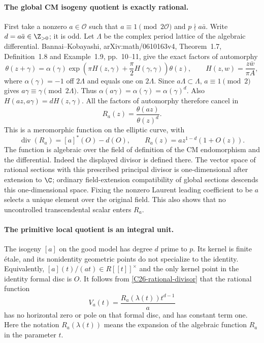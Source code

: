 \documentclass[11pt]{article}
\theoremstyle{definition}\newtheorem{definition}[theorem]{Definition}\newtheorem{remark}[theorem]{Remark}
\begin{document}
\paragraph{The global CM isogeny quotient is exactly rational.}
First take a nonzero $a\in\mathcal O$ such that
$a\equiv1\pmod{2\mathcal O}$ and $p\nmid a\bar a$.
Write $d=a\bar a\in\Z_{>0}$; it is odd.
Let $\Lambda$ be the complex period lattice of the algebraic
differential.  Bannai--Kobayashi, arXiv:math/0610163v4,
Theorem~1.7, Definition~1.8 and Example~1.9, pp.~10--11,
give the exact factors of automorphy
\[
 \theta(z+\gamma)
 =\alpha(\gamma)
   \exp\!\left(\pi H(z,\gamma)+\frac\pi2H(\gamma,\gamma)\right)
   \theta(z),\qquad
 H(z,w)=\frac{z\bar w}{\pi A},
\]
where $\alpha(\gamma)=-1$ off $2\Lambda$ and equals one on
$2\Lambda$.  Since $a\Lambda\subset\Lambda$,
$a\equiv1\pmod2$ gives $a\gamma\equiv\gamma\pmod{2\Lambda}$.
Thus $\alpha(a\gamma)=\alpha(\gamma)=\alpha(\gamma)^d$.
Also $H(az,a\gamma)=dH(z,\gamma)$.
All the factors of automorphy therefore cancel in
\[
                 R_a(z)=\frac{\theta(az)}{\theta(z)^d}.
\]
This is a meromorphic function on the elliptic curve, with
\begin{equation}\label{C26-rational-divisor}
       \operatorname{div}(R_a)=[a]^*(O)-d(O),
       \qquad R_a(z)=a z^{1-d}(1+O(z)).
\end{equation}
The function is algebraic over the field of definition of the
CM endomorphism and the differential.  Indeed the displayed
divisor is defined there.  The vector space of rational sections
with this prescribed principal divisor is one-dimensional after
extension to $\C$; ordinary field-extension compatibility of
global sections descends this one-dimensional space.  Fixing the
nonzero Laurent leading coefficient to be $a$ selects a unique
element over the original field.  This also shows that no
uncontrolled transcendental scalar enters $R_a$.

\paragraph{The primitive local quotient is an integral unit.}
The isogeny $[a]$ on the good model has degree $d$ prime to $p$.
Its kernel is finite \'etale, and its nonidentity geometric
points do not specialize to the identity.  Equivalently,
$[a](t)/(a t)\in R[[t]]^{\times}$ and the only kernel point
in the identity formal disc is $O$.
It follows from \eqref{C26-rational-divisor} that the rational
function
\[
              V_a(t)=\frac{R_a(\lambda(t))t^{d-1}}a
\]
has no horizontal zero or pole on that formal disc, and has
constant term one.  Here the notation $R_a(\lambda(t))$ means
the expansion of the algebraic function $R_a$ in the parameter
$t$.
\end{document}
